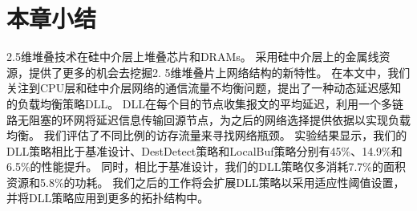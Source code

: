 \section{本章小结}

2.5维堆叠技术在硅中介层上堆叠芯片和DRAMs。
采用硅中介层上的金属线资源，提供了更多的机会去挖掘2. 5维堆叠片上网络结构的新特性。
在本文中，我们关注到CPU层和硅中介层网络的通信流量不均衡问题，提出了一种动态延迟感知的负载均衡策略DLL。
DLL在每个目的节点收集报文的平均延迟，利用一个多链路无阻塞的环网将延迟信息传输回源节点，为之后的网络选择提供依据以实现负载均衡。
我们评估了不同比例的访存流量来寻找网络瓶颈。
实验结果显示，我们的DLL策略相比于基准设计、DestDetect策略和LocalBuf策略分别有45\%、14.9\%和6.5\%的性能提升。
同时，相比于基准设计，我们的DLL策略仅多消耗7.7\%的面积资源和5.8\%的功耗。
我们之后的工作将会扩展DLL策略以采用适应性阈值设置，并将DLL策略应用到更多的拓扑结构中。